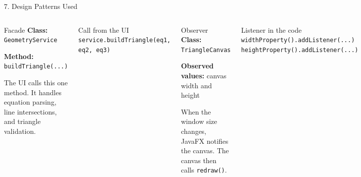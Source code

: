 \documentclass[aspectratio=169,11pt]{beamer}
\begin{document}
\begin{frame}{7. Design Patterns Used}
  \begin{columns}[T]
      \begin{block}{Facade}
        \textbf{Class:} \texttt{GeometryService}

        \vspace{4pt}
        \textbf{Method:} \texttt{buildTriangle(...)}

        \vspace{4pt}
        The UI calls this one method. It handles equation parsing,
        line intersections, and triangle validation.
      \end{block}

      \vspace{6pt}
      \begin{exampleblock}{Call from the UI}
        \texttt{service.buildTriangle(eq1, eq2, eq3)}
      \end{exampleblock}

      \begin{block}{Observer}
        \textbf{Class:} \texttt{TriangleCanvas}

        \vspace{4pt}
        \textbf{Observed values:} canvas width and height

        \vspace{4pt}
        When the window size changes, JavaFX notifies the
        canvas. The canvas then calls \texttt{redraw()}.
      \end{block}

      \vspace{6pt}
      \begin{exampleblock}{Listener in the code}
        \texttt{widthProperty().addListener(...)}\\
        \texttt{heightProperty().addListener(...)}
      \end{exampleblock}
  \end{columns}
\end{frame}
\end{document}
